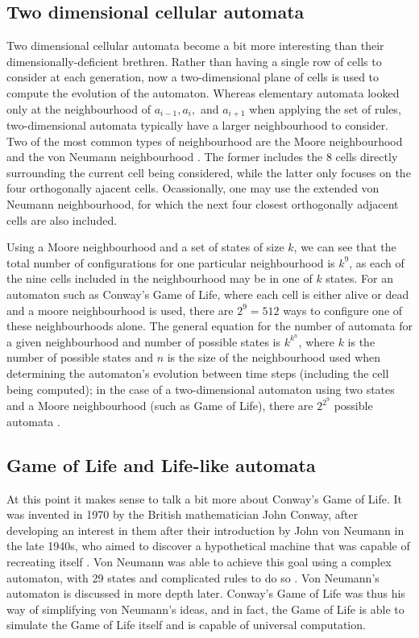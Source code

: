 \documentclass[11pt,a4paper]{article}
\begin{document}
    \subsection{Two dimensional cellular automata}
    Two dimensional cellular automata become a bit more interesting than their
    dimensionally-deficient brethren. Rather than having a single row of cells
    to consider at each generation, now a two-dimensional plane of cells is used
    to compute the evolution of the automaton. Whereas elementary automata
    looked only at the neighbourhood of $a_{i-1}, a_i,$ and $a_{i+1}$ when
    applying the set of rules, two-dimensional automata typically have a larger
    neighbourhood to consider. Two of the most common types of neighbourhood are
    the Moore neighbourhood and the von Neumann neighbourhood
    \cite{neighbourhoods}. The former includes the 8 cells directly surrounding
    the current cell being considered, while the latter only focuses on the four
    orthogonally ajacent cells. Ocassionally, one may use the extended von
    Neumann neighbourhood, for which the next four closest orthogonally adjacent
    cells are also included.

    Using a Moore neighbourhood and a set of states of size $k$, we can see that
    the total number of configurations for one particular neighbourhood is
    $k^9$, as each of the nine cells included in the neighbourhood may be in one
    of $k$ states. For an automaton such as Conway's Game of Life, where each
    cell is either alive or dead and a moore neighbourhood is used, there are
    $2^9=512$ ways to configure one of these neighbourhoods alone. The general
    equation for the number of automata for a given neighbourhood and number of
    possible states is $k^{k^n}$, where $k$ is the number of possible states and
    $n$ is the size of the neighbourhood used when determining the automaton's
    evolution between time steps (including the cell being computed); in the
    case of a two-dimensional automaton using two states and a Moore
    neighbourhood (such as Game of Life), there are $2^{2^9}$ possible automata
    \cite{num_rules}.

    \subsection{Game of Life and Life-like automata}
    At this point it makes sense to talk a bit more about Conway's Game of Life.
    It was invented in 1970 by the British mathematician John Conway, after
    developing an interest in them after their introduction by John von Neumann
    in the late 1940s, who aimed to discover a hypothetical machine that was
    capable of recreating itself \cite{GameOfLife}. Von Neumann was able to
    achieve this goal using a complex automaton, with 29 states and complicated
    rules to do so \cite{VonNeumannCA}. Von Neumann's automaton is discussed in
    more depth later. Conway's Game of Life was thus his way of simplifying von
    Neumann's ideas, and in fact, the Game of Life is able to simulate the Game
    of Life itself and is capable of universal computation.
\end{document}
